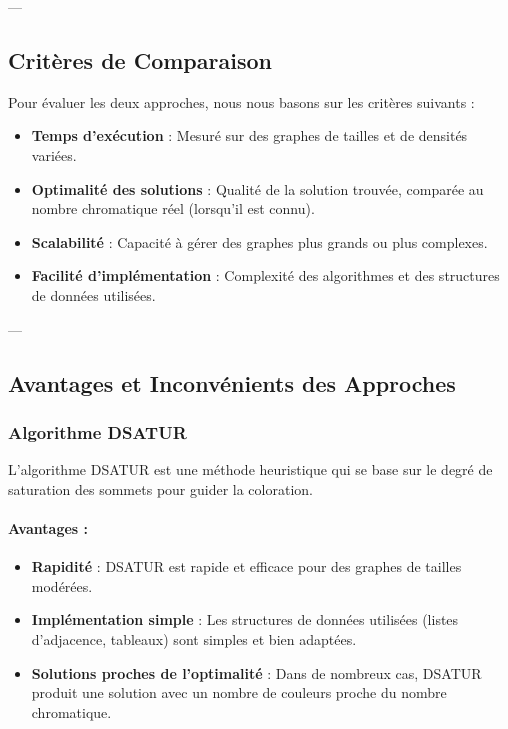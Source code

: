 \documentclass[11pt]{article}
\begin{document}
---

\subsection{Critères de Comparaison}

Pour évaluer les deux approches, nous nous basons sur les critères suivants :
\begin{itemize}
    \item \textbf{Temps d'exécution} : Mesuré sur des graphes de tailles et de densités variées.
    \item \textbf{Optimalité des solutions} : Qualité de la solution trouvée, comparée au nombre chromatique réel (lorsqu'il est connu).
    \item \textbf{Scalabilité} : Capacité à gérer des graphes plus grands ou plus complexes.
    \item \textbf{Facilité d'implémentation} : Complexité des algorithmes et des structures de données utilisées.
\end{itemize}

---

\subsection{Avantages et Inconvénients des Approches}

\subsubsection{Algorithme DSATUR}

L'algorithme DSATUR est une méthode heuristique qui se base sur le degré de saturation des sommets pour guider la coloration.

\paragraph{Avantages :}
\begin{itemize}
    \item \textbf{Rapidité} : DSATUR est rapide et efficace pour des graphes de tailles modérées.
    \item \textbf{Implémentation simple} : Les structures de données utilisées (listes d'adjacence, tableaux) sont simples et bien adaptées.
    \item \textbf{Solutions proches de l'optimalité} : Dans de nombreux cas, DSATUR produit une solution avec un nombre de couleurs proche du nombre chromatique.
\end{itemize}
\end{document}
